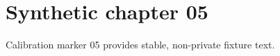 \chapter{Synthetic chapter 05}\label{chap:05}
Calibration marker 05 provides stable, non-private fixture text.

